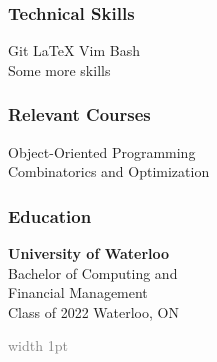 \documentclass{mxresume}
\newcommand{\Bullet}{\tiny\textbf{ }\Large\textperiodcentered\tiny\textbf{ }\textbf{ }\normalsize}
\newcommand{\Bar}{\textbf{ }\textbar\textbf{ }}
\begin{document}
\begin{minipage}[t]{0.25\textwidth}
\subsubsection*{Technical Skills}
Git \Bullet \LaTeX \Bullet Vim \Bullet Bash \\
Some more skills
\subsubsection{Relevant Courses}
Object-Oriented Programming \\
Combinatorics and Optimization
\subsubsection*{Education}
\textbf{University of Waterloo} \\
Bachelor of Computing and \\
Financial Management \\
Class of 2022 \textcolor{gray}{\Bar} Waterloo, ON \\
\end{minipage}
\begin{minipage}[t]{0.002\textwidth}
\end{minipage}
\hfill\textcolor{gray}{\vline width 1pt}\hfill
\end{document}
